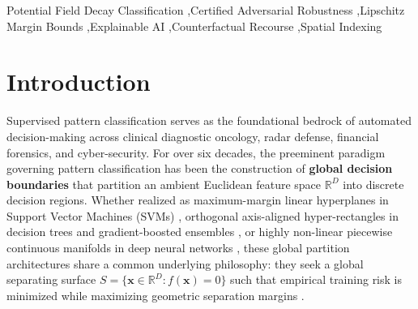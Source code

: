 \documentclass[times, review, 10pt]{elsarticle}
\begin{document}
\begin{frontmatter}
\begin{abstract}
We establish the foundational learning theory of PFDC, proving a formal \textbf{PAC Generalization Error Bound} via Rademacher complexity $\mathcal{O}(M^{-1/2})$, a \textbf{Clamped Lipschitz Gradient Lemma}, and a \textbf{Certified $\ell_2$ Margin Robustness Theorem} providing provable immunity against adversarial perturbations ($r_{\mathrm{cert}}(\mathbf{x}) = |P(\mathbf{x})| / L_P$). To resolve optimization chattering, we introduce an \textbf{Accelerating Exponential Schedule (Case~3)}, quenching 89.7\% of boundary limit cycles (reducing sign shifts from 78 to 8). To overcome measure concentration in high dimensions, we formulate an anisotropic metric tensor $\mathbf{W} = \mathrm{diag}(\mathbf{w})$ with $\ell_1$ sparsity pruning. Across extensive benchmarks, PFDC achieves \textbf{97.22\% accuracy in 2D} (\#1 rank), outperforms gradient-boosted trees in \textbf{1,000 dimensions with 75.87\% accuracy} ($d_{\mathrm{eff}} \approx 20.0$), and achieves competitive accuracy across clinical and sensor benchmarks ($97.23\%$ Banknote, $96.84\%$ Cancer, $94.29\%$ Ionosphere, $81.28\%$ Sonar). On medium-scale tabular data ($N=20,640$), PFDC achieves $83.72\%$ accuracy with sub-linear spatial Ball-Tree acceleration ($2.81\times$ speedup at $N=10,000$ with $< 10^{-14}$ error). Finally, PFDC force streamlines deliver certified counterfactual recourse \textbf{5.0$\times$ faster than legacy non-convex optimization} with guaranteed safety convergence.
\end{abstract}

\begin{keyword}
Potential Field Decay Classification \sep Certified Adversarial Robustness \sep Lipschitz Margin Bounds \sep Explainable AI \sep Counterfactual Recourse \sep Spatial Indexing
\end{keyword}

\end{frontmatter}

\section{Introduction}
\label{sec:intro}
Supervised pattern classification serves as the foundational bedrock of automated decision-making across clinical diagnostic oncology, radar defense, financial forensics, and cyber-security. For over six decades, the preeminent paradigm governing pattern classification has been the construction of \textbf{global decision boundaries} that partition an ambient Euclidean feature space $\mathbb{R}^D$ into discrete decision regions. Whether realized as maximum-margin linear hyperplanes in Support Vector Machines (SVMs) \cite{cortes1995support,scholkopf2002learning}, orthogonal axis-aligned hyper-rectangles in decision trees and gradient-boosted ensembles \cite{breiman2001random,friedman2001greedy,chen2016xgboost}, or highly non-linear piecewise continuous manifolds in deep neural networks \cite{lecun2015deep,gorishniy2021revisiting}, these global partition architectures share a common underlying philosophy: they seek a global separating surface $S = \{\mathbf{x} \in \mathbb{R}^D : f(\mathbf{x}) = 0\}$ such that empirical training risk is minimized while maximizing geometric separation margins \cite{vapnik1998statistical}.
\end{document}
